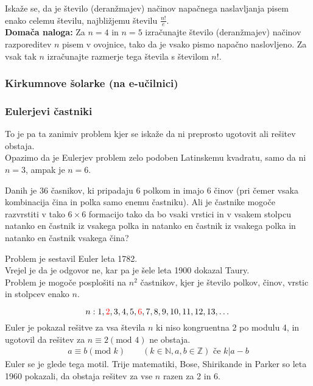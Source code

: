 \noindent
Iskaže se, da je število (deranžmajev) načinov napačnega naslavljanja pisem enako celemu številu, najbližjemu številu $\frac{n!}{e}$. \\

\noindent
\textbf{Domača naloga:} Za $n = 4$ in $n = 5$ izračunajte število (deranžmajev) načinov razporeditev $n$ pisem v ovojnice, tako da je vsako pismo napačno naslovljeno. Za vsak tak $n$ izračunajte razmerje tega števila s številom $n!$.

\subsubsection{Kirkumnove šolarke (na e-učilnici)}

\subsubsection{Eulerjevi častniki}
To je pa ta zanimiv problem kjer se iskaže da ni preprosto ugotovit ali rešitev obstaja. \\
Opazimo da je Eulerjev problem zelo podoben Latinskemu kvadratu, samo da ni $n = 3$, ampak je $n = 6$.
\begin{center}
\end{center}
Danih je 36 časnikov, ki pripadaju 6 polkom in imajo 6 činov (pri čemer vsaka kombinacija čina in polka samo enemu častniku). Ali je častnike mogoče razvrstiti v tako $6 \times 6$ formacijo tako da bo vsaki vrstici in v vsakem stolpcu natanko en častnik iz vsakega polka in natanko en častnik iz vsakega polka in natanko en častnik vsakega čina?
\begin{center}
\end{center}
Problem je sestavil Euler leta 1782. \\
Vrejel je da je odgovor ne, kar pa je šele leta 1900 dokazal Taury. \\
Problem je mogoče posplošiti na $n^2$ častnikov, kjer je število polkov, činov, vrstic in stolpcev enako $n$.
\begin{center}
    
\end{center}
$$
n: 1, \textcolor{red}{2}, 3, 4, 5, \textcolor{red}{6}, 7, 8, 9, 10, 11, 12, 13,\dots
$$
Euler je pokazal rešitve za vsa števila $n$ ki niso kongruentna 2 po modulu 4, in ugotovil da rešitev za $n \equiv 2 (\text{mod } 4)$ ne obstaja.
\begin{align*}
    a \equiv b (\text{mod } k) \text{ } \text{ } \text{ } (k \in \mathbb{N}, a,b \in \mathbb{Z}) \text{ če } k | a - b
\end{align*}
Euler se je glede tega motil. Trije matematiki, Bose, Shirikande in Parker so leta 1960 pokazali, da obstaja rešitev za vse $n$ razen za 2 in 6. \\

